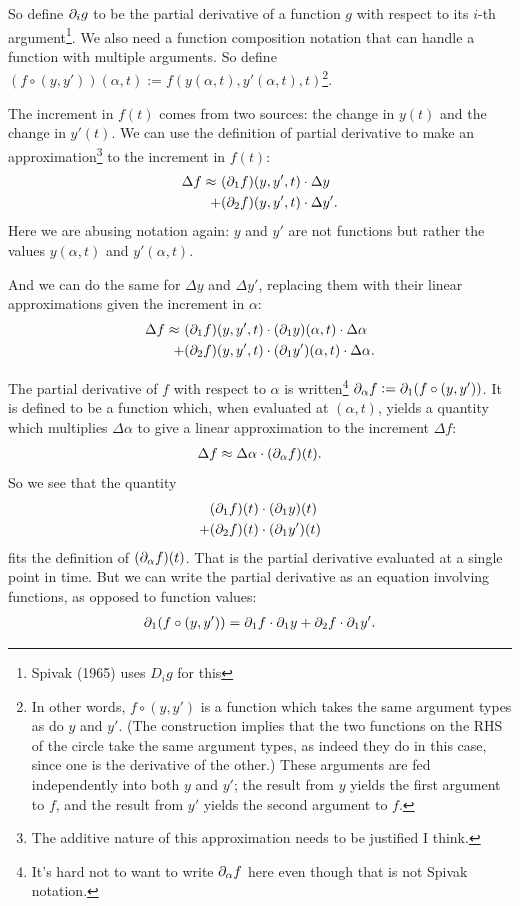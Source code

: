 So define $\partial_i g$ to be the partial derivative of a function $g$ with respect to its $i$-th
argument\footnote{Spivak (1965) uses $D_i g$ for this}. We also need a function composition notation
that can handle a function with multiple arguments. So define
${(f \circ (y, y'))(\alpha, t) := f(y(\alpha, t), y'(\alpha, t), t)}$\footnote{In other words,
  $f \circ (y, y')$ is a function which takes the same argument types as do $y$ and $y'$. (The
  construction implies that the two functions on the RHS of the circle take the same argument types,
  as indeed they do in this case, since one is the derivative of the other.) These arguments are fed
  independently into both $y$ and $y'$; the result from $y$ yields the first argument to $f$, and
  the result from $y'$ yields the second argument to $f$.}.

The increment in $f(t)$ comes from two sources: the change in $y(t)$ and the change in $y'(t)$. We
can use the definition of partial derivative to make an approximation\footnote{The additive nature
  of this approximation needs to be justified I think.} to the increment in $f(t)$:
\begin{align*}
  \Delta f \approx ~ &(\partial_1 f)(y, y', t) \cdot \Delta y \\
                 +   &(\partial_2 f)(y, y', t) \cdot \Delta y'.
\end{align*}
Here we are abusing notation again: $y$ and $y'$ are not functions but rather the values $y(\alpha, t)$
and $y'(\alpha, t)$.

And we can do the same for $\Delta y$ and $\Delta y'$, replacing them with their linear
approximations given the increment in $\alpha$:
\begin{align*}
  \Delta f \approx ~ &(\partial_1 f)(y, y', t) \cdot (\partial_1 y)(\alpha, t) \cdot \Delta \alpha \\
                   + &(\partial_2 f)(y, y', t) \cdot (\partial_1 y')(\alpha, t) \cdot \Delta \alpha.
\end{align*}

The partial derivative of $f$ with respect to $\alpha$ is written\footnote{It's hard not to want to
  write $\partial_\alpha f$ here even though that is not Spivak notation.}
$\partial_\alpha f := \partial_1 (f \circ (y, y'))$. It is defined to be a function which, when evaluated at
$(\alpha, t)$, yields a quantity which multiplies $\Delta\alpha$ to give a linear approximation to the
increment $\Delta f$:
\begin{align*}
  \Delta f \approx \Delta\alpha \cdot (\partial_\alpha f)(t).
\end{align*}
So we see that the quantity
\begin{align*}
    &(\partial_1 f)(t) \cdot (\partial_1 y)(t) \\
  + &(\partial_2 f)(t) \cdot (\partial_1 y')(t)
\end{align*}
fits the definition of $(\partial_\alpha f)(t)$. That is the partial derivative evaluated at a single
point in time. But we can write the partial derivative as an equation involving functions, as
opposed to function values:
\begin{align*}
  \partial_1 (f \circ (y, y')) = \partial_1 f \cdot \partial_1 y + \partial_2 f \cdot \partial_1 y'.
\end{align*}

